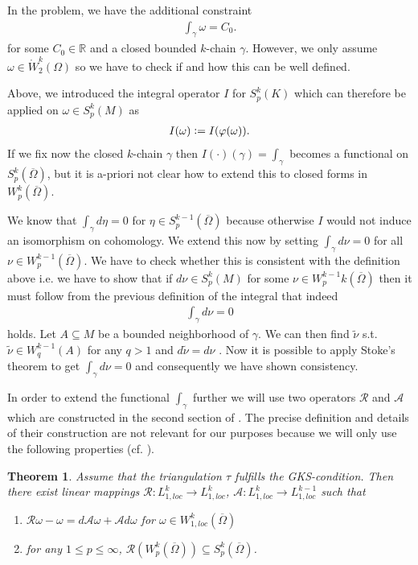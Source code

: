 \documentclass[12pt,a4paper]{article}
\newtheorem{theorem}{Theorem}
\theoremstyle{definition}
\newcommand{\omegabar}{\overline{\Omega}}
\newcommand{\real}{\mathbb{R}}
\newcommand{\rop}{\mathscr{R}} %
\begin{document}
In the problem, we have the additional constraint 
\begin{align*}
    \int_\gamma \omega = C_0.
\end{align*}
for some $C_0 \in \real$ and a closed bounded $k$-chain $\gamma$. 
However, we only assume 
$\omega \in \mathring{W}^k_2(\Omega)$ so we have to check if and how this can
be well defined.

Above, we introduced the integral operator $I$ for $S^k_p(K)$ which can 
therefore be applied on $\omega \in S^k_p(M)$ as
\begin{align*}
    I(\omega) \vcentcolon= I (\varphi(\omega)).
\end{align*}
\noindent If we fix now the closed 
$k$-chain $\gamma$ then $I(\cdot)(\gamma) = \int_\gamma$ becomes a functional on
$S^k_p(\omegabar)$, but it is a-priori not clear how to extend this to closed forms in
$W_p^k(\omegabar)$. 

We know that $\int_\gamma d\eta = 0$ for $\eta \in S^{k-1}_p(\omegabar)$ because 
otherwise $I$ would not induce an isomorphism on cohomology. We extend this now
by setting $\int_\gamma d\nu = 0$ for all $\nu \in W^{k-1}_p(\omegabar)$. 
We have to check whether this is consistent with the definition above i.e. we
have to show that if $d\nu \in S^k_p(M)$ for some 
$\nu \in W_p^{k-1}k(\omegabar)$ then 
it must follow from the previous definition of the integral that indeed
\begin{align*}
    \int_\gamma d\nu = 0
\end{align*}
holds.
Let $A \subseteq M$ be a bounded neighborhood of $\gamma$. We can then find 
$\tilde{\nu}$ s.t.  $\tilde{\nu} \in W^{k-1}_q(A)$ for any $q > 1$ and 
$d\tilde{\nu} = d\nu$ \cite[Thm 3.1.1]{schwarz}. Now it is possible to apply 
Stoke's theorem \cite[Thm. 9]{goldshtein_integration} to get  
$\int_\gamma d\nu = 0$ and consequently we have shown consistency.


In order to extend the functional $\int_\gamma$ 
further we will use two operators
$\mathscr{R}$ and $\mathscr{A}$ which are constructed in the second section 
of \cite{goldshtein}. The precise definition and details of their construction
are not relevant for our purposes because we will only use
the following properties (cf. \cite[Thm.2]{goldshtein}).

\begin{theorem}\label{operators}
    Assume that the triangulation $\tau$ fulfills the GKS-condition.
    Then there exist linear mappings $\mathscr{R}: L^k_{1,loc} \rightarrow 
    L^k_{1,loc}$, $\mathscr{A}: L^k_{1,loc} \rightarrow L^{k-1}_{1,loc}$ 
    such that
    \begin{enumerate}
        \item $\mathscr{R}\omega - \omega = 
            d\mathscr{A}\omega + \mathscr{A}d\omega$ for 
            $\omega \in W^k_{1,loc}(\omegabar)$
        \item for any $1 \leq p \leq \infty$, 
            $\rop(W^k_p(\omegabar)) \subseteq S^k_p(\omegabar)$.
    \end{enumerate}
\end{theorem}
\end{document}
